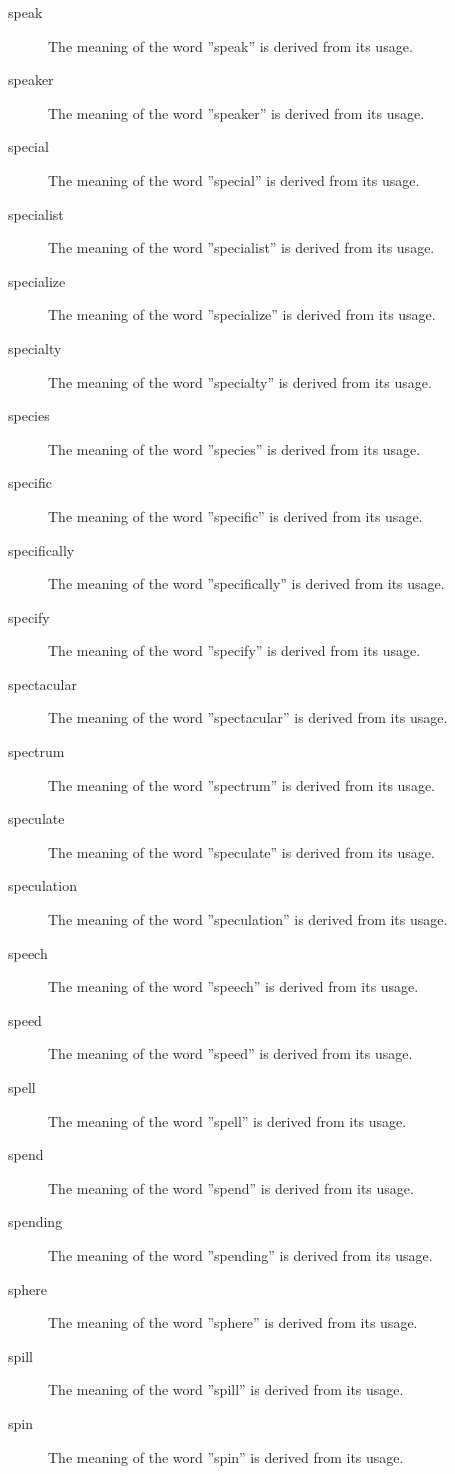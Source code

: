 \documentclass[12pt, letterpaper]{memoir}
\begin{document}
\begin{description}
\item[speak] The meaning of the word ''speak'' is derived from its usage.
\item[speaker] The meaning of the word ''speaker'' is derived from its usage.
\item[special] The meaning of the word ''special'' is derived from its usage.
\item[specialist] The meaning of the word ''specialist'' is derived from its usage.
\item[specialize] The meaning of the word ''specialize'' is derived from its usage.
\item[specialty] The meaning of the word ''specialty'' is derived from its usage.
\item[species] The meaning of the word ''species'' is derived from its usage.
\item[specific] The meaning of the word ''specific'' is derived from its usage.
\item[specifically] The meaning of the word ''specifically'' is derived from its usage.
\item[specify] The meaning of the word ''specify'' is derived from its usage.
\item[spectacular] The meaning of the word ''spectacular'' is derived from its usage.
\item[spectrum] The meaning of the word ''spectrum'' is derived from its usage.
\item[speculate] The meaning of the word ''speculate'' is derived from its usage.
\item[speculation] The meaning of the word ''speculation'' is derived from its usage.
\item[speech] The meaning of the word ''speech'' is derived from its usage.
\item[speed] The meaning of the word ''speed'' is derived from its usage.
\item[spell] The meaning of the word ''spell'' is derived from its usage.
\item[spend] The meaning of the word ''spend'' is derived from its usage.
\item[spending] The meaning of the word ''spending'' is derived from its usage.
\item[sphere] The meaning of the word ''sphere'' is derived from its usage.
\item[spill] The meaning of the word ''spill'' is derived from its usage.
\item[spin] The meaning of the word ''spin'' is derived from its usage.

\end{description}
\end{document}
